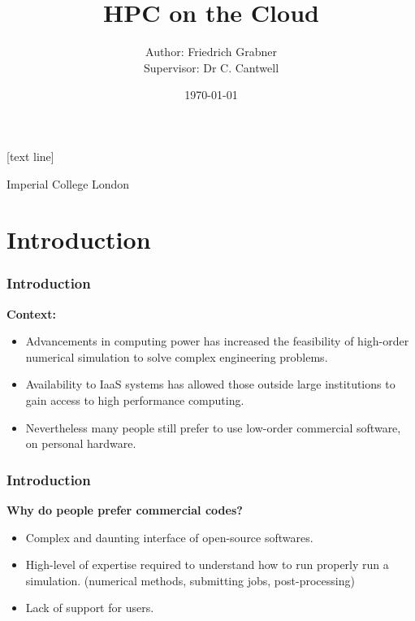 \documentclass{beamer}
\begin{document}
[text line]{\parbox{\linewidth}{\vspace*{-8pt}\centering Imperial College London}
}
\title{\huge{HPC on the Cloud}} 
\author{Author: Friedrich Grabner\\
Supervisor: Dr C. Cantwell}
\date{\today} 

\begin{frame}
\titlepage
\end{frame}

\section{Introduction} 
\begin{frame}\frametitle{Introduction}
\textbf{Context:}
\begin{itemize}
\item Advancements in computing power has increased the feasibility of high-order numerical simulation to solve complex engineering problems.
\item Availability to IaaS systems has allowed those outside large institutions to gain access to high performance computing.
\end{itemize}
\textbf{\color{red}{Problem:}}
\begin{itemize}
\item Nevertheless many people still prefer to use low-order commercial software, on personal hardware.
\end{itemize}
\end{frame}

\begin{frame}\frametitle{Introduction}
\textbf{Why do people prefer commercial codes?}
\begin{itemize}
\item Complex and daunting interface of open-source softwares.
\item High-level of expertise required to understand how to run properly run a simulation. (numerical methods, submitting jobs, post-processing)
\item Lack of support for users.
\end{itemize}
\end{frame}
\end{document}
